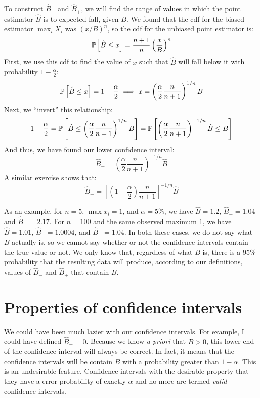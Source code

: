 To construct $\hat{B}_-$ and $\hat{B}_+$, we will find the range of values in which the point
estimator $\hat{B}$ is to expected fall, given $B$. We found that the cdf for the biased
estimator $\max_i X_i$ was $(x/B)^n$, so the cdf for the
unbiased point estimator is:
\begin{equation*}
    \mathbb{P}\left[{\hat{B} \leq x}\right] = \frac{n+1}{n} \left(\frac{x}{B}\right)^n
\end{equation*}
First, we use this cdf to find the value of $x$ such that $\hat{B}$ will fall below it
with probability $1-\frac{\alpha}{2}$:
\begin{equation*}
    \mathbb{P}\left[{\hat{B} \leq x}\right] = 1 - \frac{\alpha}{2} \implies x = \left( \frac{\alpha}{2} \frac{n}{n+1}\right)^{1/n} B
\end{equation*}
Next, we ``invert'' this relationship:
\begin{equation*}
    1 - \frac{\alpha}{2}
    = \mathbb{P}\left[{\hat{B} \leq \left( \frac{\alpha}{2} \frac{n}{n+1}\right)^{1/n} B}\right]
    = \mathbb{P}\left[{\left( \frac{\alpha}{2} \frac{n}{n+1}\right)^{-1/n} \hat{B} \leq B}\right]
\end{equation*}
And thus, we have found our lower confidence interval:
\begin{equation*}
    \hat{B}_- = \left( \frac{\alpha}{2} \frac{n}{n+1}\right)^{-1/n} \hat{B}
\end{equation*}
A similar exercise shows that:
\begin{equation*}
    \hat{B}_+ = \left[ \left(1- \frac{\alpha}{2}\right) \frac{n}{n+1}\right]^{-1/n} \hat{B}
\end{equation*}

As an example, for $n=5$, $\max x_i = 1$, and $\alpha = 5\%$, we have $\hat{B} = 1.2$, $\hat{B}_- = 1.04$ and $\hat{B}_+ = 2.17$. For $n=100$ and the same observed maximum $1$,
we have $\hat{B} = 1.01$,
$\hat{B}_- = 1.0004$, and $\hat{B}_+ = 1.04$. In both these cases, we do not say what $B$
actually is, so we cannot say whether or not the confidence intervals contain the true value
or not. We only know that, regardless of what $B$ is, there is a 95\% probability that the
resulting data will produce, according to our definitions, values of $\hat{B}_-$ and
$\hat{B}_+$ that contain $B$.

\section{Properties of confidence intervals}

We could have been much lazier with our confidence intervals. For example, I could have
defined $\hat{B}_- = 0$. Because we know \textit{a priori} that $B>0$, this lower end
of the confidence interval will always be correct. In fact, it means that the confidence
intervals will be contain $B$ with a probability greater than $1-\alpha$. This is an
undesirable feature. Confidence intervals with the desirable property that they have a
error probability of exactly $\alpha$ and no more are termed \emph{valid} confidence intervals.

